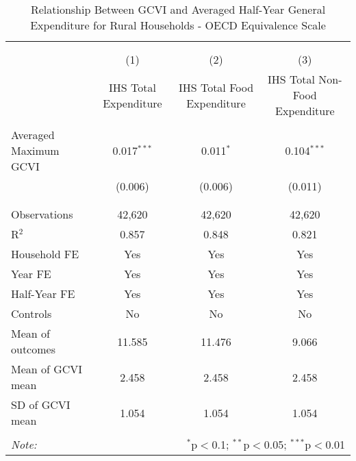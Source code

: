 
\begin{table}[!htbp] \centering 
  \caption{Relationship Between GCVI and Averaged Half-Year General Expenditure for Rural Households - OECD Equivalence Scale} 
  \label{gcvi_table_3_rural.tex} 
\normalsize 
\begin{tabular}{@{\extracolsep{5pt}}lccc} 
\\[-1.8ex]\hline 
\hline \\[-1.8ex] 
\\[-1.8ex] & (1) & (2) & (3)\\ 
 & IHS Total Expenditure & IHS Total Food Expenditure & IHS Total Non-Food Expenditure \\ 
\hline \\[-1.8ex] 
 Averaged Maximum GCVI & 0.017$^{***}$ & 0.011$^{*}$ & 0.104$^{***}$ \\ 
  & (0.006) & (0.006) & (0.011) \\ 
  & & & \\ 
\hline \\[-1.8ex] 
Observations & 42,620 & 42,620 & 42,620 \\ 
R$^{2}$ & 0.857 & 0.848 & 0.821 \\ 
Household FE & Yes & Yes & Yes \\ 
Year FE & Yes & Yes & Yes \\ 
Half-Year FE & Yes & Yes & Yes \\ 
Controls & No & No & No \\ 
Mean of outcomes & 11.585 & 11.476 & 9.066 \\ 
Mean of GCVI mean & 2.458 & 2.458 & 2.458 \\ 
SD of GCVI mean & 1.054 & 1.054 & 1.054 \\ 
\hline \\[-1.8ex] 
\textit{Note:}  & \multicolumn{3}{r}{$^{*}$p$<$0.1; $^{**}$p$<$0.05; $^{***}$p$<$0.01} \\ 
\end{tabular} 
\end{table} 
